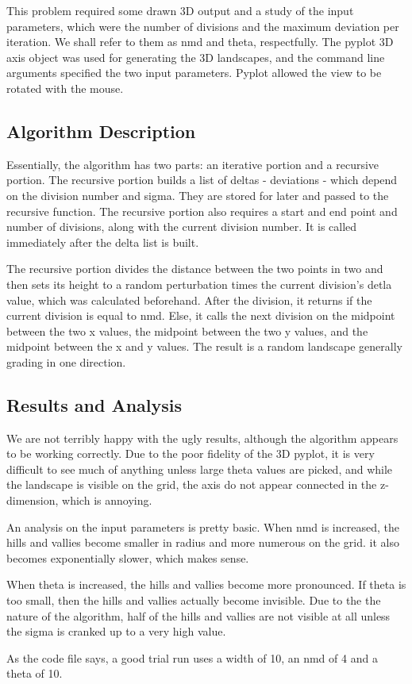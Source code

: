 This problem required some drawn 3D output and a study of the input parameters, which were the number of divisions and the maximum deviation per iteration.  We shall refer to them as nmd and theta, respectfully.  The pyplot 3D axis object was used for generating the 3D landscapes, and the command line arguments specified the two input parameters.  Pyplot allowed the view to be rotated with the mouse.

\subsection{Algorithm Description}

Essentially, the algorithm has two parts: an iterative portion and a recursive portion.  The recursive portion builds a list of deltas - deviations - which depend on the division number and sigma.  They are stored for later and passed to the recursive function.  The recursive portion also requires a start and end point and number of divisions, along with the current division number.  It is called immediately after the delta list is built.

The recursive portion divides the distance between the two points in two and then sets its height to a random perturbation times the current division's detla value, which was calculated beforehand.  After the division, it returns if the current division is equal to nmd.  Else, it calls the next division on the midpoint between the two x values, the midpoint between the two y values, and the midpoint between the x and y values.  The result is a random landscape generally grading in one direction.

\subsection{Results and Analysis}

We are not terribly happy with the ugly results, although the algorithm appears to be working correctly.   Due to the poor fidelity of the 3D pyplot, it is very difficult to see much of anything unless large theta values are picked, and while the landscape is visible on the grid, the axis do not appear connected in the z-dimension, which is annoying.

An analysis on the input parameters is pretty basic.  When nmd is increased, the hills and vallies become smaller in radius and more numerous on the grid.  it also becomes exponentially slower, which makes sense.

When theta is increased, the hills and vallies become more pronounced.   If theta is too small, then the hills and vallies actually become invisible.  Due to the the nature of the algorithm, half of the hills and vallies are not visible at all unless the sigma is cranked up to a very high value.

As the code file says, a good trial run uses a width of 10, an nmd of 4 and a theta of 10.  